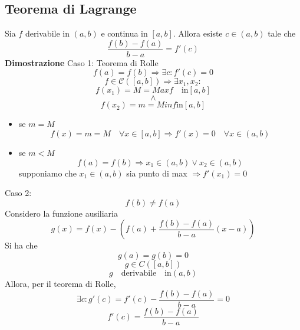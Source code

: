 \documentclass[12pt]{article}
\begin{document}
\subsection{Teorema di Lagrange}
Sia $f$ derivabile in $(a,b)$ e continua in $[a,b]$.
Allora esiste $c \in (a,b)$ tale che
\[ \frac{f(b)-f(a)}{b-a} = f'(c) \]
\textbf{Dimostrazione}\newline
Caso 1: Teorema di Rolle
\[ f(a) = f(b) \Rightarrow \exists c: f'(c) = 0 \]
\[f \in \mathscr{C}([a,b]) \Rightarrow \exists x_1, x_2 :\] 
\[f(x_1) = M = Maxf \quad \text{in} [a,b] \]
\[\wedge\]
\[f(x_2) = m = Minf \text{in} [a,b] \]
\begin{itemize}
  \item se $m=M$
  \[ f(x) = m = M \quad \forall x \in [a,b] \Rightarrow f'(x) = 0 \quad \forall x \in (a,b) \]
  \item se $m<M$ 
  \[f(a) = f(b) \Rightarrow x_1 \in (a,b) \vee x_2 \in (a,b)\]
  supponiamo che $x_1 \in (a,b)$ sia punto di max $\Rightarrow f'(x_1)=0$
\end{itemize}
Caso 2: \[f(b) \neq f(a)\]Considero la funzione ausiliaria 
\[g(x) = f(x) -(f(a) + \frac{f(b) - f(a)}{b-a}(x-a))\]
Si ha che 
\[g(a) = g(b) = 0\] 
\[g \in C([a,b])\] 
\[g \quad \text{derivabile} \quad \text{in} (a,b)\]
Allora, per il teorema di Rolle, 
\[ \exists c: g'(c) = f'(c) - \frac{f(b)-f(a)}{b-a} = 0\]
\[f'(c) = \frac{f(b) - f(a)}{b-a}\]
\end{document}

